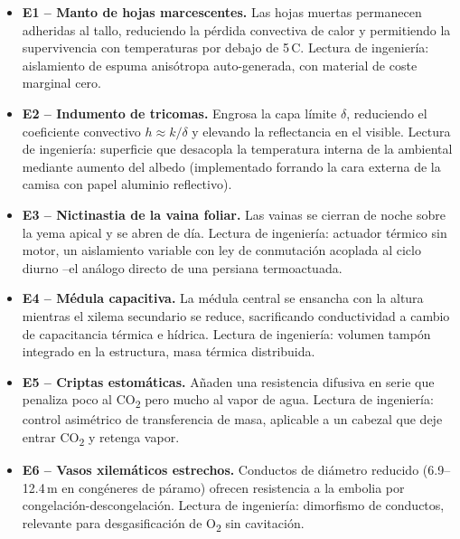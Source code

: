 \documentclass[conference]{IEEEtran}
\begin{document}
\begin{itemize}
\item \textbf{E1 -- Manto de hojas marcescentes.} Las hojas muertas
permanecen adheridas al tallo, reduciendo la p\'erdida convectiva de calor
y permitiendo la supervivencia con temperaturas por debajo de
5\,\textdegree C. Lectura de ingenier\'ia: aislamiento de espuma
anis\'otropa auto-generada, con material de coste marginal cero.

\item \textbf{E2 -- Indumento de tricomas.} Engrosa la capa l\'imite
$\delta$, reduciendo el coeficiente convectivo $h \approx k/\delta$ y
elevando la reflectancia en el visible. Lectura de ingenier\'ia: superficie
que desacopla la temperatura interna de la ambiental mediante aumento del
albedo (implementado forrando la cara externa de la camisa con papel aluminio reflectivo).

\item \textbf{E3 -- Nictinastia de la vaina foliar.} Las vainas se cierran
de noche sobre la yema apical y se abren de d\'ia. Lectura de ingenier\'ia:
actuador t\'ermico sin motor, un aislamiento variable con ley de
conmutaci\'on acoplada al ciclo diurno --el an\'alogo directo de una
persiana termoactuada.

\item \textbf{E4 -- M\'edula capacitiva.} La m\'edula central se ensancha
con la altura mientras el xilema secundario se reduce, sacrificando
conductividad a cambio de capacitancia t\'ermica e h\'idrica. Lectura de
ingenier\'ia: volumen tamp\'on integrado en la estructura, masa t\'ermica
distribuida.

\item \textbf{E5 -- Criptas estom\'aticas.} A\~naden una resistencia
difusiva en serie que penaliza poco al CO\textsubscript{2} pero mucho al
vapor de agua. Lectura de ingenier\'ia: control asim\'etrico de
transferencia de masa, aplicable a un cabezal que deje entrar CO\textsubscript{2}
y retenga vapor.

\item \textbf{E6 -- Vasos xilem\'aticos estrechos.} Conductos de
di\'ametro reducido (6.9--12.4\,\textmu m en cong\'eneres de p\'aramo)
ofrecen resistencia a la embolia por congelaci\'on-descongelaci\'on.
Lectura de ingenier\'ia: dimorfismo de conductos, relevante para
desgasificaci\'on de O\textsubscript{2} sin cavitaci\'on.
\end{itemize}

\end{document}
